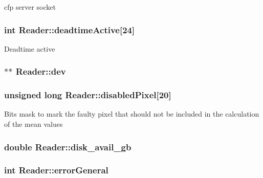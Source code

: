 cfp server socket \hypertarget{classReader_aee93b4550b1f413ac5e263e0a2f85b25}{
\subsubsection[{deadtime\-Active}]{\setlength{\rightskip}{0pt plus 5cm}int Reader\-::deadtime\-Active\mbox{[}24\mbox{]}\hspace{0.3cm}{\ttfamily [private]}}}\label{classReader_aee93b4550b1f413ac5e263e0a2f85b25}
Deadtime active \hypertarget{classReader_a759e4aca2327cd6959af3273bb10c979}{
\subsubsection[{dev}]{$\ast$$\ast$ Reader\-::dev\hspace{0.3cm}{\ttfamily [private]}}}\label{classReader_a759e4aca2327cd6959af3273bb10c979}
\hypertarget{classReader_ac749831ff1afb95fcc67c3100b45c6d7}{
\subsubsection[{disabled\-Pixel}]{\setlength{\rightskip}{0pt plus 5cm}unsigned long Reader\-::disabled\-Pixel\mbox{[}20\mbox{]}\hspace{0.3cm}{\ttfamily [private]}}}\label{classReader_ac749831ff1afb95fcc67c3100b45c6d7}
Bits mask to mark the faulty pixel that should not be included in the calculation of the mean values \hypertarget{classReader_a0746e7e813a05ee8648875ee2776b5f4}{
\subsubsection[{disk\-\_\-avail\-\_\-gb}]{\setlength{\rightskip}{0pt plus 5cm}double Reader\-::disk\-\_\-avail\-\_\-gb\hspace{0.3cm}{\ttfamily [private]}}}\label{classReader_a0746e7e813a05ee8648875ee2776b5f4}
\hypertarget{classReader_ae6d9d7dae0b2b71985a8d2df2ee09819}{
\subsubsection[{error\-General}]{\setlength{\rightskip}{0pt plus 5cm}int Reader\-::error\-General\hspace{0.3cm}{\ttfamily [private]}}}\label{classReader_ae6d9d7dae0b2b71985a8d2df2ee09819}
